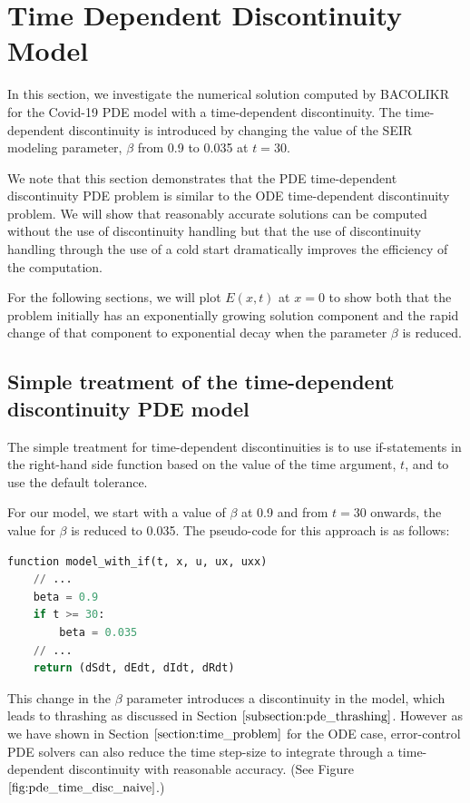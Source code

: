 \section{Time Dependent Discontinuity Model}
\label{subsection:pde_time_intro}
In this section, we investigate the numerical solution computed by BACOLIKR for the Covid-19 PDE model with a time-dependent discontinuity. The time-dependent discontinuity is introduced by changing the value of the SEIR modeling parameter, $\beta$ from 0.9 to 0.035 at $t=30$.

We note that this section demonstrates that the PDE time-dependent discontinuity PDE problem is similar to the ODE time-dependent discontinuity problem. We will show that reasonably accurate solutions can be computed without the use of discontinuity handling but that the use of discontinuity handling through the use of a cold start dramatically improves the efficiency of the computation.

For the following sections, we will plot $E(x, t)$ at $x=0$ to show both that the problem initially has an exponentially growing solution component and the rapid change of that component to exponential decay when the parameter $\beta$ is reduced.

\subsection{Simple treatment of the time-dependent discontinuity PDE model}
\label{subsubsection:pde_time_naive}
The simple treatment for time-dependent discontinuities is to use if-statements in the right-hand side function based on the value of the time argument, $t$, and to use the default tolerance.

For our model, we start with a value of $\beta$ at 0.9 and from $t=30$ onwards, the value for $\beta$ is reduced to 0.035. The pseudo-code for this approach is as follows:

\begin{minipage}{\linewidth}
\begin{lstlisting}[language=Python]
function model_with_if(t, x, u, ux, uxx)
	// ...
	beta = 0.9
	if t >= 30:
		beta = 0.035
	// ...
	return (dSdt, dEdt, dIdt, dRdt)

\end{lstlisting}
\end{minipage}

This change in the $\beta$ parameter introduces a discontinuity in the model, which leads to thrashing as discussed in Section $\ref{subsection:pde_thrashing}$. However as we have shown in Section $\ref{section:time_problem}$ for the ODE case, error-control PDE solvers can also reduce the time step-size to integrate through a time-dependent discontinuity with reasonable accuracy. (See Figure $\ref{fig:pde_time_disc_naive}$.)

